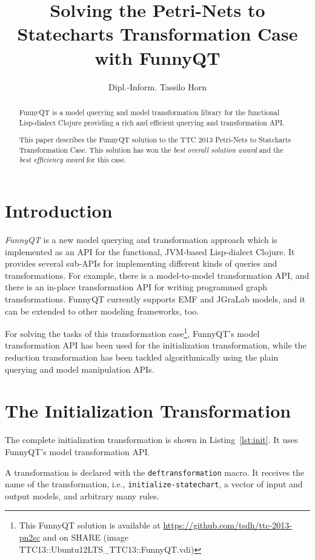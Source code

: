 \documentclass[submission]{eptcs}
\title{Solving the Petri-Nets to Statecharts Transformation Case with FunnyQT}
\author{Dipl.-Inform. Tassilo Horn
  \email{horn@uni-koblenz.de}
  \institute{Institute for Software Technology, University Koblenz-Landau, Germany}}
\begin{document}
\maketitle

\begin{abstract}
  FunnyQT is a model querying and model transformation library for the
  functional Lisp-dialect Clojure providing a rich and efficient querying and
  transformation API.

  This paper describes the FunnyQT solution to the TTC 2013 Petri-Nets to
  Statcharts Transformation Case.  This solution has won the \emph{best overall
    solution award} and the \emph{best efficiency award} for this case.
\end{abstract}

\section{Introduction}
\label{sec:introduction}

\emph{FunnyQT} is a new model querying and transformation approach which is
implemented as an API for the functional, JVM-based Lisp-dialect Clojure.  It
provides several sub-APIs for implementing different kinds of queries and
transformations.  For example, there is a model-to-model transformation API,
and there is an in-place transformation API for writing programmed graph
transformations.  FunnyQT currently supports EMF and JGraLab models, and it can
be extended to other modeling frameworks, too.

For solving the tasks of this transformation case\footnote{This FunnyQT
  solution is available at \url{https://github.com/tsdh/ttc-2013-pn2sc} and on
  SHARE (image
  \textsf{TTC13::Ubuntu12LTS\_TTC13::FunnyQT.vdi})\label{fn:github}}, FunnyQT's
model transformation API has been used for the initialization transformation,
while the reduction transformation has been tackled algorithmically using the
plain querying and model manipulation APIs.

\section{The Initialization Transformation}
\label{sec:init-transformation}

The complete initialization transformation is shown in Listing~\ref{lst:init}.
It uses FunnyQT's model transformation API.

A transformation is declared with the \verb|deftransformation| macro.  It
receives the name of the transformation, i.e., \verb|initialize-statechart|, a
vector of input and output models, and arbitrary many rules.
\end{document}
